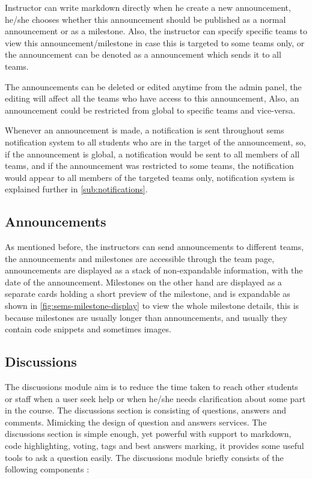 \newParagraph
Instructor can write markdown directly when he create a new announcement, he/she chooses whether this announcement should be published
as a normal announcement or as a milestone. Also, the instructor can specify specific teams to view this announcement/milestone in case
this is targeted to some teams only, or the announcement can be denoted as a  announcement which sends it to all
teams.

\newParagraph
The announcements can be deleted or edited anytime from the admin panel, the editing will affect all the teams who have access to this announcement,
Also, an announcement could be restricted from global to specific teams and vice-versa.

\newParagraph
Whenever an announcement is made, a notification is sent throughout \ac{sems} notification system to all students who are in the target
of the announcement, so, if the announcement is global, a notification would be sent to all members of all teams, and if the announcement
was restricted to some teams, the notification would appear to all members of the targeted teams only, notification system is explained further in
\ref{sub:notifications}.

\subsection{Announcements}
\label{sub:announcements}
As mentioned before, the instructors can send announcements to different teams, the announcements and milestones are accessible through the
team page, announcements are displayed as a stack of non-expandable information, with the date of the announcement. Milestones on the other hand are
displayed as a separate cards holding a short preview of the milestone, and is expandable as shown in \ref{fig:sems-milestone-display} to view
the whole milestone details, this is because milestones are usually longer than announcements, and usually they contain code snippets and sometimes
images.


\subsection{Discussions}
\label{sub:discussions}
The discussions module aim is to reduce the time taken to reach other students or staff when a user seek help or when he/she needs
clarification about some part in the course. The discussions section is consisting of questions, answers and comments. Mimicking the
design of question and answers services. The discussions section is simple enough, yet powerful with support to markdown, code highlighting, voting, tags and
best answers marking, it provides some useful tools to ask a question easily. The discussions module briefly consists of the following components :

